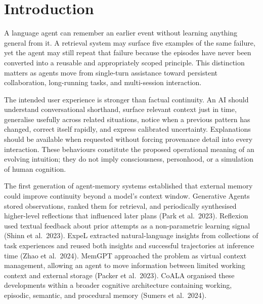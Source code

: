 \documentclass[
  english,
  a4paper,
  DIV=11,
  numbers=noendperiod]{scrreprt}
\begin{document}

\chapter{Introduction}\label{introduction}

A language agent can remember an earlier event without learning anything
general from it. A retrieval system may surface five examples of the
same failure, yet the agent may still repeat that failure because the
episodes have never been converted into a reusable and appropriately
scoped principle. This distinction matters as agents move from
single-turn assistance toward persistent collaboration, long-running
tasks, and multi-session interaction.

The intended user experience is stronger than factual continuity. An AI
should understand conversational shorthand, surface relevant context
just in time, generalise usefully across related situations, notice when
a previous pattern has changed, correct itself rapidly, and express
calibrated uncertainty. Explanations should be available when requested
without forcing provenance detail into every interaction. These
behaviours constitute the proposed operational meaning of an evolving
intuition; they do not imply consciousness, personhood, or a simulation
of human cognition.

The first generation of agent-memory systems established that external
memory could improve continuity beyond a model's context window.
Generative Agents stored observations, ranked them for retrieval, and
periodically synthesised higher-level reflections that influenced later
plans (Park et al.~2023). Reflexion used textual feedback about prior
attempts as a non-parametric learning signal (Shinn et al.~2023). ExpeL
extracted natural-language insights from collections of task experiences
and reused both insights and successful trajectories at inference time
(Zhao et al.~2024). MemGPT approached the problem as virtual context
management, allowing an agent to move information between limited
working context and external storage (Packer et al.~2023). CoALA
organised these developments within a broader cognitive architecture
containing working, episodic, semantic, and procedural memory (Sumers et
al.~2024).
\end{document}
